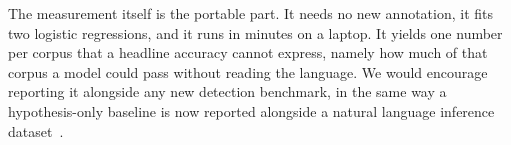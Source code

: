 The measurement itself is the portable part. It needs no new annotation, it fits two logistic regressions, and it runs in minutes on a laptop. It yields one number per corpus that a headline accuracy cannot express, namely how much of that corpus a model could pass without reading the language. We would encourage reporting it alongside any new detection benchmark, in the same way a hypothesis-only baseline is now reported alongside a natural language inference dataset~\cite{Poliak2018hypothesis}.

